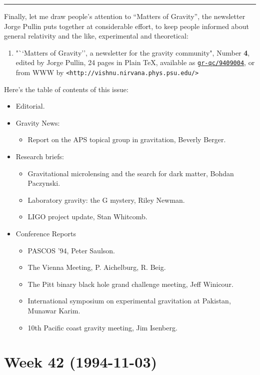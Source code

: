 \documentclass{article}
\def\tightlist{}
\begin{document}
\begin{center}\rule{0.5\linewidth}{0.5pt}\end{center}

Finally, let me draw people's attention to ``Matters of Gravity'', the
newsletter Jorge Pullin puts together at considerable effort, to keep
people informed about general relativity and the like, experimental and
theoretical:

\begin{enumerate}
\def\labelenumi{\arabic{enumi})}
\setcounter{enumi}{6}
\tightlist
\item
  "``Matters of Gravity'', a newsletter for the gravity community",
  Number \textbf{4}, edited by Jorge Pullin, 24 pages in Plain TeX,
  available as
  \href{http://xxx.lanl.gov/abs/gr-qc/9409004}{\texttt{gr-qc/9409004}},
  or from WWW by
  \texttt{\textless{}http://vishnu.nirvana.phys.psu.edu/\textgreater{}}
\end{enumerate}

Here's the table of contents of this issue:

\begin{itemize}
\tightlist
\item
  Editorial.
\item
  Gravity News:

  \begin{itemize}
  \tightlist
  \item
    Report on the APS topical group in gravitation, Beverly Berger.
  \end{itemize}
\item
  Research briefs:

  \begin{itemize}
  \tightlist
  \item
    Gravitational microlensing and the search for dark matter, Bohdan
    Paczynski.
  \item
    Laboratory gravity: the G mystery, Riley Newman.
  \item
    LIGO project update, Stan Whitcomb.
  \end{itemize}
\item
  Conference Reports

  \begin{itemize}
  \tightlist
  \item
    PASCOS '94, Peter Saulson.
  \item
    The Vienna Meeting, P. Aichelburg, R. Beig.
  \item
    The Pitt binary black hole grand challenge meeting, Jeff Winicour.
  \item
    International symposium on experimental gravitation at Pakistan,
    Munawar Karim.
  \item
    10th Pacific coast gravity meeting, Jim Isenberg.
  \end{itemize}
\end{itemize}
\hypertarget{week-42-1994-11-03}{%
\section{Week 42 (1994-11-03)}\label{week-42-1994-11-03}}
\end{document}
